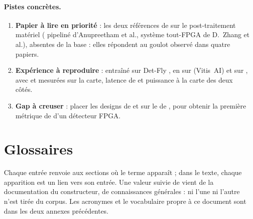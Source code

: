 \documentclass[11pt,a4paper]{article}
\begin{document}
\paragraph{Pistes concrètes.}
\begin{enumerate}
  \item \textbf{Papier à lire en priorité} : les deux références de
    \citet{2025-hozhabr-survey-real-time-object-detection} sur le post-traitement matériel
    ( pipeliné d'Anupreetham et al., système tout-FPGA de D.~Zhang et al.), absentes de
    la base : elles répondent au goulot  observé dans quatre papiers.
  \item \textbf{Expérience à reproduire} :  entraîné sur Det-Fly
    \citep{2021-zheng-air-air-visual-detection-micro}, en  sur  (Vitis~AI) et sur
    , avec  et  mesurées sur la carte, latence de  et
    puissance à la carte des deux côtés.
  \item \textbf{Gap à creuser} : placer les designs de
    \citet{2025-cali-optimized-implementation-yolov3-tiny-real} et
    \citet{2025-elhence-fpga-accelerated-yolox-enhanced-attention} sur le  de
    \citet{arxiv-2204.10898-roofline-model-uavs-bottleneck-analysis}, pour obtenir la
    première métrique de  d'un détecteur FPGA.
\end{enumerate}




\appendix


\clearpage
\section*{Glossaires}
Chaque entrée renvoie aux sections où le terme apparaît ; dans le texte, chaque apparition
est un lien vers son entrée. Une valeur suivie de \constr{} vient de la documentation du
constructeur, \horscorpus{} de connaissances générales : ni l'une ni l'autre n'est tirée du
corpus. Les acronymes et le vocabulaire propre à ce document sont dans les deux annexes
précédentes.
\printglossary[type=plateformes]
\printglossary[type=modeles]
\printglossary[type=metriques]
\end{document}
